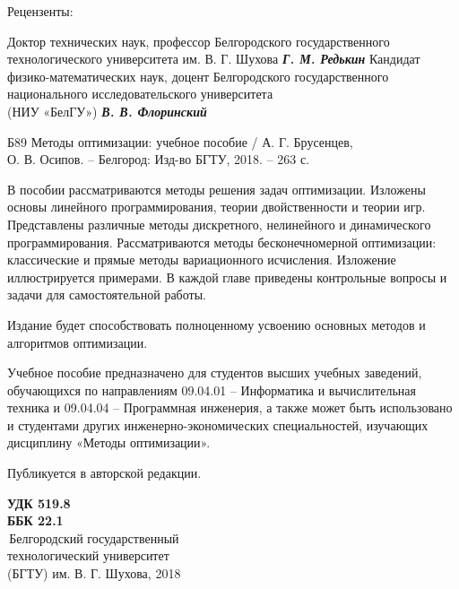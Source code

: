 \vspace{0.3cm}
\begin{center}
Рецензенты:
\end{center}
\begin{center}
\small{Доктор технических наук, профессор Белгородского государственного технологического университета им. В. Г. Шухова  \textbf{\textit{Г. М. Редькин}}
Кандидат физико-математических наук, доцент Белгородского государственного национального исследовательского университета \\
(НИУ «БелГУ»)  \textbf{\textit{В. В. Флоринский}}}
\end{center}
\vspace{1.6cm}
\begin{center}
Б89	Методы оптимизации: учебное пособие / А. Г. Брусенцев, \\
О. В. Осипов. – Белгород: Изд-во БГТУ, 2018. – 263 с.%
\end{center}
\vspace{1.1cm}
\footnotesize{В пособии рассматриваются методы решения задач оптимизации. Изложены основы линейного программирования, теории двойственности и теории игр. Представлены различные методы дискретного, нелинейного и динамического программирования. Рассматриваются методы бесконечномерной оптимизации: классические и прямые методы вариационного исчисления. Изложение иллюстрируется примерами. В каждой главе приведены контрольные вопросы и задачи для самостоятельной работы.

Издание будет способствовать полноценному усвоению основных методов и алгоритмов оптимизации.

Учебное пособие предназначено для студентов высших учебных заведений, обучающихся по направлениям 09.04.01 – Информатика и вычислительная техника и 09.04.04 – Программная инженерия, а также может быть использовано и студентами других инженерно-экономических специальностей, изучающих дисциплину «Методы оптимизации».

Публикуется в авторской редакции.}
\begin{flushright}
\vspace{0.3cm}
\textbf{УДК 519.8 \\
ББК 22.1\\}
\vspace{0.3cm}
\textcopyright\,Белгородский государственный \\
технологический университет \\
(БГТУ) им. В. Г. Шухова, 2018
\end{flushright}
